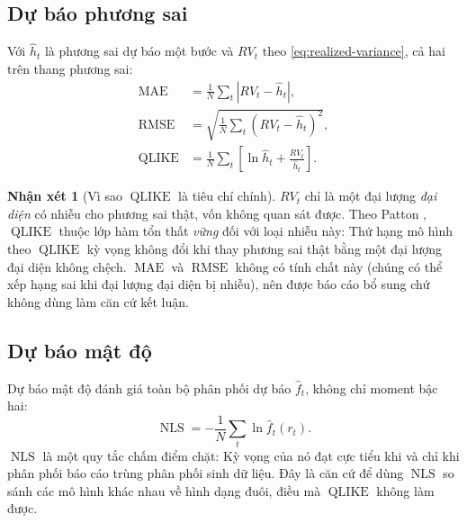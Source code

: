 \documentclass[12pt,a4paper]{article}
\numberwithin{equation}{section}
\theoremstyle{definition}
\newtheorem{remark}{Nhận xét}[section]
\newcommand{\MAE}{\operatorname{MAE}}
\newcommand{\RMSE}{\operatorname{RMSE}}
\newcommand{\QLIKE}{\operatorname{QLIKE}}
\newcommand{\NLS}{\operatorname{NLS}}
\begin{document}
	\subsection{Dự báo phương sai}\label{subsec:vol-forecast}
	Với $\widehat h_t$ là phương sai dự báo một bước và $RV_t$ theo
	\eqref{eq:realized-variance}, cả hai trên thang phương sai:
	\begin{align}
		\MAE &= \frac{1}{N}\sum_{t}\left|RV_t-\widehat h_t\right|,
		\label{eq:mae-vol}\\
		\RMSE &= \sqrt{\frac{1}{N}\sum_{t}\left(RV_t-\widehat h_t\right)^{2}},
		\label{eq:rmse-vol}\\
		\QLIKE &= \frac{1}{N}\sum_{t}\left[\ln\widehat h_t+\frac{RV_t}{\widehat h_t}\right].
		\label{eq:qlike}
	\end{align}
	
	\begin{remark}[Vì sao $\QLIKE$ là tiêu chí chính]\label{rem:qlike}
		$RV_t$ chỉ là một đại lượng \emph{đại diện} có nhiễu cho phương sai thật, vốn không quan
		sát được. Theo Patton \cite{patton2011}, $\QLIKE$ thuộc lớp hàm tổn thất \emph{vững} đối
		với loại nhiễu này: Thứ hạng mô hình theo $\QLIKE$ kỳ vọng không đổi khi thay phương sai
		thật bằng một đại lượng đại diện không chệch. $\MAE$ và $\RMSE$ không có tính chất này (chúng có thể xếp hạng sai khi đại lượng đại diện bị nhiễu), nên được báo cáo bổ sung chứ
		không dùng làm căn cứ kết luận.
	\end{remark}
	
	\subsection{Dự báo mật độ}\label{subsec:density-forecast}
	Dự báo mật độ đánh giá toàn bộ phân phối dự báo $\widehat f_t$, không chỉ moment bậc hai:
	\begin{equation}
		\NLS=-\frac{1}{N}\sum_{t}\ln\widehat f_t(r_t).
		\label{eq:negative-log-score}
	\end{equation}
	$\NLS$ là một quy tắc chấm điểm chặt: Kỳ vọng của nó đạt cực tiểu khi và chỉ khi phân
	phối báo cáo trùng phân phối sinh dữ liệu. Đây là căn cứ để dùng $\NLS$ so sánh các mô
	hình khác nhau về hình dạng đuôi, điều mà $\QLIKE$ không làm được.
	
\end{document}
